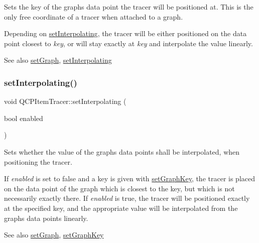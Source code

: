Sets the key of the graph\textquotesingle{}s data point the tracer will be positioned at. This is the only free coordinate of a tracer when attached to a graph.

Depending on \hyperlink{class_q_c_p_item_tracer_a6c244a9d1175bef12b50afafd4f5fcd2}{set\+Interpolating}, the tracer will be either positioned on the data point closest to {\itshape key}, or will stay exactly at {\itshape key} and interpolate the value linearly.

\begin{DoxySeeAlso}{See also}
\hyperlink{class_q_c_p_item_tracer_af5886f4ded8dd68cb4f3388f390790c0}{set\+Graph}, \hyperlink{class_q_c_p_item_tracer_a6c244a9d1175bef12b50afafd4f5fcd2}{set\+Interpolating} 
\end{DoxySeeAlso}
\mbox{\label{class_q_c_p_item_tracer_a6c244a9d1175bef12b50afafd4f5fcd2}} 
\subsubsection{\texorpdfstring{set\+Interpolating()}{setInterpolating()}}
{\footnotesize\ttfamily void Q\+C\+P\+Item\+Tracer\+::set\+Interpolating (\begin{DoxyParamCaption}\item[{bool}]{enabled }\end{DoxyParamCaption})}

Sets whether the value of the graph\textquotesingle{}s data points shall be interpolated, when positioning the tracer.

If {\itshape enabled} is set to false and a key is given with \hyperlink{class_q_c_p_item_tracer_a6840143b42f3b685cedf7c6d83a704c8}{set\+Graph\+Key}, the tracer is placed on the data point of the graph which is closest to the key, but which is not necessarily exactly there. If {\itshape enabled} is true, the tracer will be positioned exactly at the specified key, and the appropriate value will be interpolated from the graph\textquotesingle{}s data points linearly.

\begin{DoxySeeAlso}{See also}
\hyperlink{class_q_c_p_item_tracer_af5886f4ded8dd68cb4f3388f390790c0}{set\+Graph}, \hyperlink{class_q_c_p_item_tracer_a6840143b42f3b685cedf7c6d83a704c8}{set\+Graph\+Key} 
\end{DoxySeeAlso}
\mbox{\label{class_q_c_p_item_tracer_af8048636fc1ef0152e51809b008df2ca}} 
